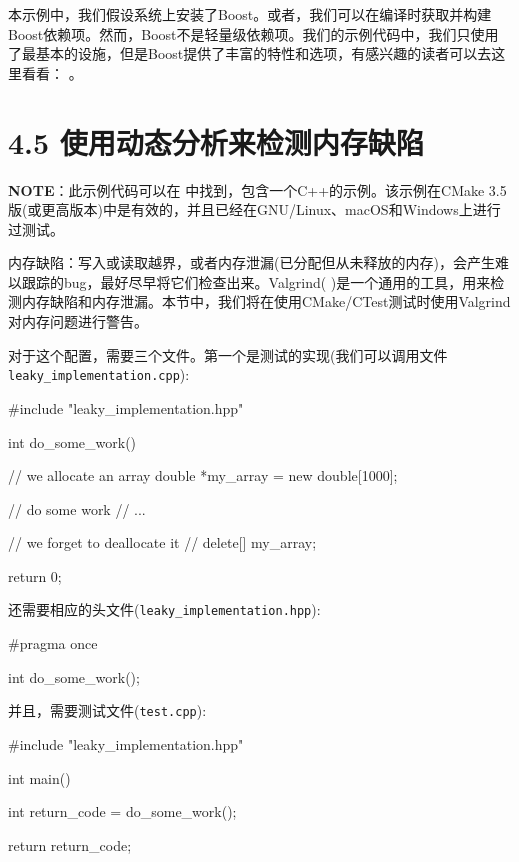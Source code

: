 
本示例中，我们假设系统上安装了Boost。或者，我们可以在编译时获取并构建Boost依赖项。然而，Boost不是轻量级依赖项。我们的示例代码中，我们只使用了最基本的设施，但是Boost提供了丰富的特性和选项，有感兴趣的读者可以去这里看看： 。


\section{4.5 使用动态分析来检测内存缺陷}

\begin{myInfoBox}
\textbf{NOTE}：此示例代码可以在  中找到，包含一个C++的示例。该示例在CMake 3.5版(或更高版本)中是有效的，并且已经在GNU/Linux、macOS和Windows上进行过测试。
\end{myInfoBox}

内存缺陷：写入或读取越界，或者内存泄漏(已分配但从未释放的内存)，会产生难以跟踪的bug，最好尽早将它们检查出来。Valgrind(  )是一个通用的工具，用来检测内存缺陷和内存泄漏。本节中，我们将在使用CMake/CTest测试时使用Valgrind对内存问题进行警告。


对于这个配置，需要三个文件。第一个是测试的实现(我们可以调用文件\texttt{leaky\_implementation.cpp}):

\begin{codebox}[cpp]
#include "leaky_implementation.hpp"

int do_some_work() {
  
  // we allocate an array
  double *my_array = new double[1000];
  
  // do some work
  // ...
  
  // we forget to deallocate it
  // delete[] my_array;
  
  return 0;
}
\end{codebox}

还需要相应的头文件(\texttt{leaky\_implementation.hpp}):

\begin{codebox}[cpp]
#pragma once

int do_some_work();
\end{codebox}

并且，需要测试文件(\texttt{test.cpp}):

\begin{codebox}[cpp]
#include "leaky_implementation.hpp"

int main() {
  int return_code = do_some_work();
  
  return return_code;
}
\end{codebox}

